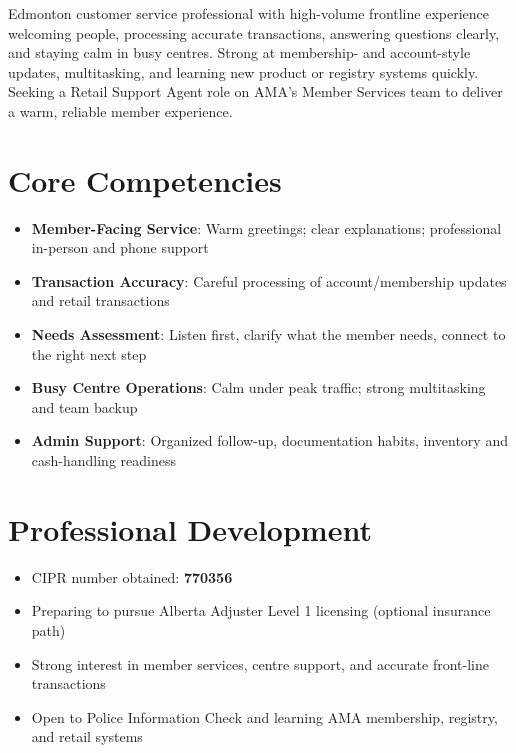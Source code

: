 \documentclass[11pt,a4paper,sans]{moderncv}
\begin{document}
\makecvtitle

\vspace{6pt}
\small{Edmonton customer service professional with high-volume frontline experience welcoming people, processing accurate transactions, answering questions clearly, and staying calm in busy centres. Strong at membership- and account-style updates, multitasking, and learning new product or registry systems quickly. Seeking a Retail Support Agent role on AMA's Member Services team to deliver a warm, reliable member experience.}

\section{Core Competencies}
\vspace{1pt}
\begin{itemize}
\item \textbf{Member-Facing Service}: Warm greetings; clear explanations; professional in-person and phone support
\item \textbf{Transaction Accuracy}: Careful processing of account/membership updates and retail transactions
\item \textbf{Needs Assessment}: Listen first, clarify what the member needs, connect to the right next step
\item \textbf{Busy Centre Operations}: Calm under peak traffic; strong multitasking and team backup
\item \textbf{Admin Support}: Organized follow-up, documentation habits, inventory and cash-handling readiness
\end{itemize}

\section{Professional Development}
\vspace{1pt}
\begin{itemize}
\item CIPR number obtained: \textbf{770356}
\item Preparing to pursue Alberta Adjuster Level 1 licensing (optional insurance path)
\item Strong interest in member services, centre support, and accurate front-line transactions
\item Open to Police Information Check and learning AMA membership, registry, and retail systems
\end{itemize}
\end{document}
